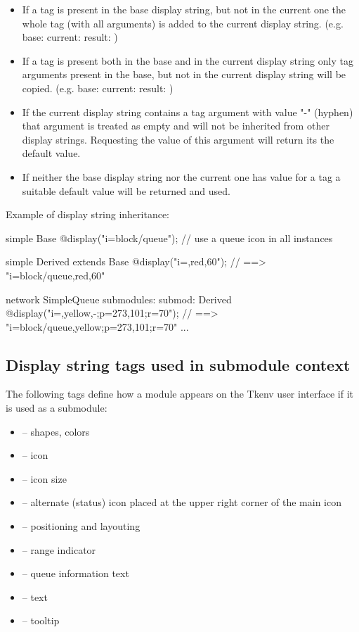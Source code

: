\begin{itemize}
  \item If a tag is present in the base display string, but not in the current one
        the whole tag (with all arguments) is added to the current display string.
        (e.g. base:  current:  result: )
  \item If a tag is present both in the base and in the current display string
        only tag arguments present in the base, but not in the current display string
        will be copied.
        (e.g. base:  current:  result: )
  \item If the current display string contains a tag argument with value "-" (hyphen)
        that argument is treated as empty and will not be inherited from other
        display strings. Requesting the value of this argument will return its the
        default value.
  \item If neither the base display string nor the current one has value for a tag
        a suitable default value will be returned and used.
\end{itemize}

Example of display string inheritance:

\begin{ned}
simple Base {
    @display("i=block/queue"); // use a queue icon in all instances
}

simple Derived extends Base {
    @display("i=,red,60");  // ==> "i=block/queue,red,60"
}

network SimpleQueue {
    submodules:
        submod: Derived {
            @display("i=,yellow,-;p=273,101;r=70");  // ==> "i=block/queue,yellow;p=273,101;r=70"
        }
        ...
}
\end{ned}


\subsection{Display string tags used in submodule context}

The following tags define how a module appears on the Tkenv user interface
if it is used as a submodule:
\begin{itemize}
  \item{ -- shapes, colors}
  \item{ -- icon}
  \item{ -- icon size}
  \item{ -- alternate (status) icon placed at the upper right corner of the main icon}
  \item{ -- positioning and layouting}
  \item{ -- range indicator}
  \item{ -- queue information text}
  \item{ -- text}
  \item{ -- tooltip}
\end{itemize}


